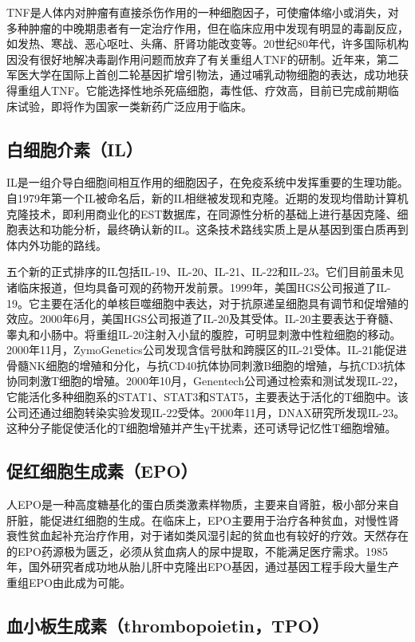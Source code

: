 TNF是人体内对肿瘤有直接杀伤作用的一种细胞因子，可使瘤体缩小或消失，对多种肿瘤的中晚期患者有一定治疗作用，但在临床应用中发现有明显的毒副反应，如发热、寒战、恶心呕吐、头痛、肝肾功能改变等。20世纪80年代，许多国际机构因没有很好地解决毒副作用问题而放弃了有关重组人TNF的研制。近年来，第二军医大学在国际上首创二轮基因扩增引物法，通过哺乳动物细胞的表达，成功地获得重组人TNF。它能选择性地杀死癌细胞，毒性低、疗效高，目前已完成前期临床试验，即将作为国家一类新药广泛应用于临床。


\subsection{白细胞介素（IL）}

IL是一组介导白细胞间相互作用的细胞因子，在免疫系统中发挥重要的生理功能。自1979年第一个IL被命名后，新的IL相继被发现和克隆。近期的发现均借助计算机克隆技术，即利用商业化的EST数据库，在同源性分析的基础上进行基因克隆、细胞表达和功能分析，最终确认新的IL。这条技术路线实质上是从基因到蛋白质再到体内外功能的路线。

五个新的正式排序的IL包括IL-19、IL-20、IL-21、IL-22和IL-23。它们目前虽未见诸临床报道，但均具备可观的药物开发前景。1999年，美国HGS公司报道了IL-19。它主要在活化的单核巨噬细胞中表达，对于抗原递呈细胞具有调节和促增殖的效应。2000年6月，美国HGS公司报道了IL-20及其受体。IL-20主要表达于脊髓、睾丸和小肠中。将重组IL-20注射入小鼠的腹腔，可明显刺激中性粒细胞的移动。2000年11月，ZymoGenetics公司发现含信号肽和跨膜区的IL-21受体。IL-21能促进骨髓NK细胞的增殖和分化，与抗CD40抗体协同刺激B细胞的增殖，与抗CD3抗体协同刺激T细胞的增殖。2000年10月，Genentech公司通过检索和测试发现IL-22，它能活化多种细胞系的STAT1、STAT3和STAT5，主要表达于活化的T细胞中。该公司还通过细胞转染实验发现IL-22受体。2000年11月，DNAX研究所发现IL-23。这种分子能促使活化的T细胞增殖并产生γ干扰素，还可诱导记忆性T细胞增殖。


\subsection{促红细胞生成素（EPO）}

人EPO是一种高度糖基化的蛋白质类激素样物质，主要来自肾脏，极小部分来自肝脏，能促进红细胞的生成。在临床上，EPO主要用于治疗各种贫血，对慢性肾衰性贫血起补充治疗作用，对于诸如类风湿引起的贫血也有较好的疗效。天然存在的EPO药源极为匮乏，必须从贫血病人的尿中提取，不能满足医疗需求。1985年，国外研究者成功地从胎儿肝中克隆出EPO基因，通过基因工程手段大量生产重组EPO由此成为可能。


\subsection{血小板生成素（thrombopoietin，TPO）}

